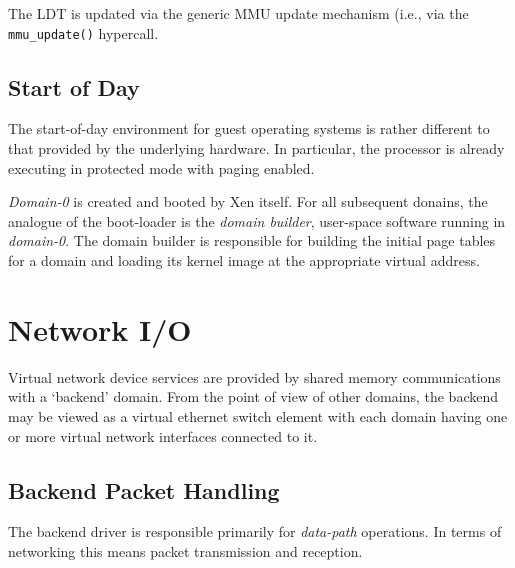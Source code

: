 \documentclass[11pt,twoside,final,openright]{xenstyle}
\begin{document}
The LDT is updated via the generic MMU update mechanism (i.e., via 
the {\tt mmu\_update()} hypercall. 

\section{Start of Day} 

The start-of-day environment for guest operating systems is rather
different to that provided by the underlying hardware. In particular,
the processor is already executing in protected mode with paging
enabled.

{\it Domain-0} is created and booted by Xen itself. For all subsequent
donains, the analogue of the boot-loader is the {\it domain builder},
user-space software running in {\it domain-0}. The domain builder 
is responsible for building the initial page tables for a domain  
and loading its kernel image at the appropriate virtual address. 



\chapter{Network I/O}

Virtual network device services are provided by shared memory
communications with a `backend' domain.  From the point of view of
other domains, the backend may be viewed as a virtual ethernet switch
element with each domain having one or more virtual network interfaces
connected to it.

\section{Backend Packet Handling}
The backend driver is responsible primarily for {\it data-path} operations.
In terms of networking this means packet transmission and reception.
\end{document}
